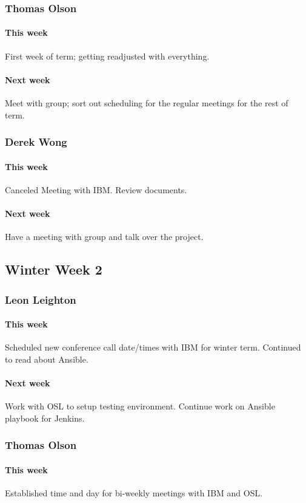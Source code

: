 \documentclass[10pt,letterpaper,onecolumn,draftclsnofoot]{IEEEtran}
\begin{document}
\subsubsection{Thomas Olson}
\paragraph{This week}First week of term; getting readjusted with everything.
\paragraph{Next week}Meet with group; sort out scheduling for the regular meetings for the rest of term.


\subsubsection{Derek Wong}
\paragraph{This week}Canceled Meeting with IBM\@. Review documents.
\paragraph{Next week}Have a meeting with group and talk over the project.


\subsection{Winter Week 2}
\subsubsection{Leon Leighton}
\paragraph{This week}Scheduled new conference call date/times with IBM for winter term.   
Continued to read about Ansible.
\paragraph{Next week}Work with OSL to setup testing environment.  
Continue work on Ansible playbook for Jenkins.


\subsubsection{Thomas Olson}
\paragraph{This week}Established time and day for bi-weekly meetings with IBM and OSL.
\end{document}
